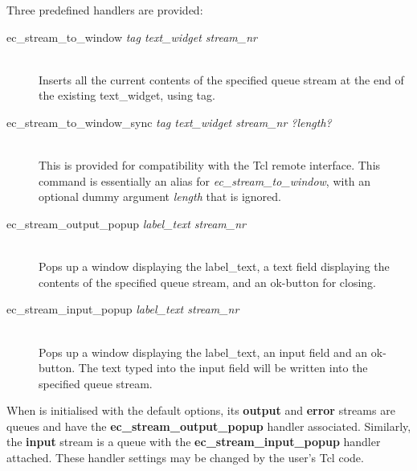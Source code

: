 Three predefined handlers are provided:
\begin{description}
\item[ec_stream_to_window {\it tag text_widget stream_nr}]\ \\
        Inserts all the current contents of the specified queue stream
        at the end of the existing text_widget, using tag.
\item[ec_stream_to_window_sync {\it tag text_widget stream_nr ?length?}]\ \\
	This is provided for compatibility with the Tcl remote
	interface. This command is essentially an alias for {\it
	ec_stream_to_window}, with an optional dummy argument {\it length}
	that is ignored.

\item[ec_stream_output_popup {\it label_text stream_nr}]\ \\
        Pops up a window displaying the label_text,
        a text field displaying the contents of the specified queue stream,
        and an ok-button for closing.

\item[ec_stream_input_popup {\it label_text stream_nr}]\ \\
        Pops up a window displaying the label_text, an input field
        and an ok-button. The text typed into the input field will
        be written into the specified queue stream.
\end{description}


When {\eclipse} is initialised with the default options, its {\bf output} and
{\bf error} streams are queues and have the {\bf ec_stream_output_popup} handler
associated.  Similarly, the {\bf input} stream is a queue with the
{\bf ec_stream_input_popup} handler attached.
These handler settings may be changed by the user's Tcl code.




